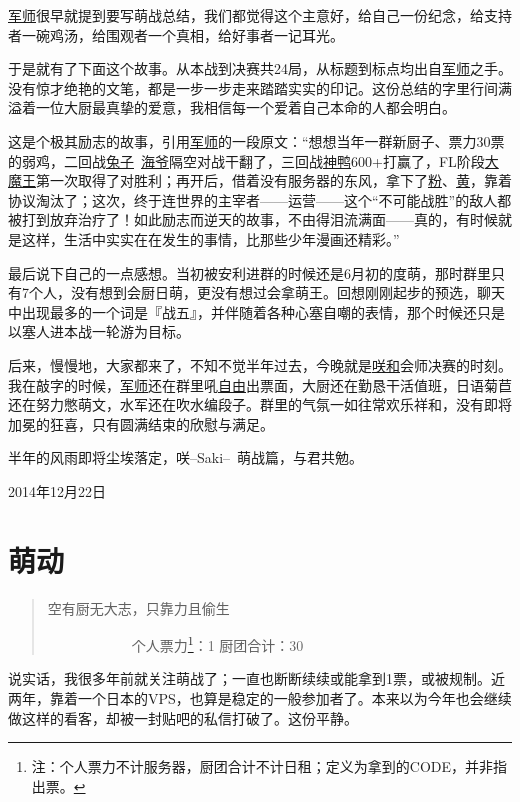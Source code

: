 \uline{军师}很早就提到要写萌战总结，我们都觉得这个主意好，给自己一份纪念，给支持者一碗鸡汤，给围观者一个真相，给好事者一记耳光。

于是就有了下面这个故事。从本战到决赛共24局，从标题到标点均出自\uline{军师}之手。没有惊才绝艳的文笔，都是一步一步走来踏踏实实的印记。这份总结的字里行间满溢着一位大厨最真挚的爱意，我相信每一个爱着自己本命的人都会明白。

这是个极其励志的故事，引用\uline{军师}的一段原文：“想想当年一群新厨子、票力30票的弱鸡，二回战\uline{兔子}~\uline{海爷}隔空对战干翻了，三回战\uline{神鸭}600+打赢了，FL阶段\uline{大魔王}第一次取得了对胜利；再开后，借着没有服务器的东风，拿下了\uline{粉}、\uline{黄}，靠着协议淘汰了；这次，终于连世界的主宰者——运营——这个“不可能战胜”的敌人都被打到放弃治疗了！如此励志而逆天的故事，不由得泪流满面——真的，有时候就是这样，生活中实实在在发生的事情，比那些少年漫画还精彩。”

最后说下自己的一点感想。当初被安利进群的时候还是6月初的度萌，那时群里只有7个人，没有想到会厨日萌，更没有想过会拿萌王。回想刚刚起步的预选，聊天中出现最多的一个词是『战五』，并伴随着各种心塞自嘲的表情，那个时候还只是以塞人进本战一轮游为目标。

后来，慢慢地，大家都来了，不知不觉半年过去，今晚就是\uline{咲}\uline{和}会师决赛的时刻。我在敲字的时候，\uline{军师}还在群里吼\uline{自由}出票面，大厨还在勤恳干活值班，日语菊苣还在努力憋萌文，水军还在吹水编段子。群里的气氛一如往常欢乐祥和，没有即将加冕的狂喜，只有圆满结束的欣慰与满足。

半年的风雨即将尘埃落定，咲–Saki–~萌战篇，与君共勉。

\begin{flushright}

2014年12月22日
\end{flushright}

\chapter{萌动}

\begin{quote}
空有厨无大志，只靠力且偷生

　　　　　　个人票力\footnote{注：个人票力不计服务器，厨团合计不计日租；定义为拿到的CODE，并非指出票。}：1 厨团合计：30
\end{quote}

说实话，我很多年前就关注萌战了；一直也断断续续或能拿到1票，或被规制。近两年，靠着一个日本的VPS，也算是稳定的一般参加者了。本来以为今年也会继续做这样的看客，却被一封贴吧的私信打破了。这份平静。

